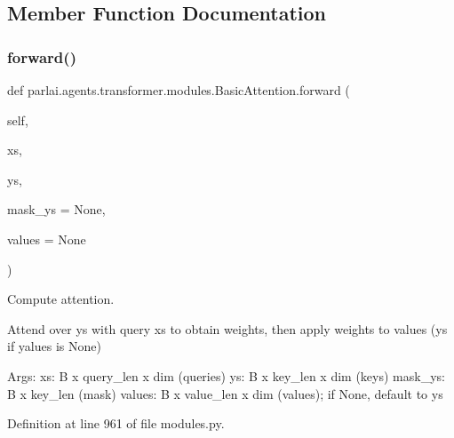 \subsection{Member Function Documentation}
\mbox{\label{classparlai_1_1agents_1_1transformer_1_1modules_1_1BasicAttention_adb18b6c2564672c1820b3c72583dc0c0}} 
\subsubsection{\texorpdfstring{forward()}{forward()}}
{\footnotesize\ttfamily def parlai.\+agents.\+transformer.\+modules.\+Basic\+Attention.\+forward (\begin{DoxyParamCaption}\item[{}]{self,  }\item[{}]{xs,  }\item[{}]{ys,  }\item[{}]{mask\+\_\+ys = {\ttfamily None},  }\item[{}]{values = {\ttfamily None} }\end{DoxyParamCaption})}

\begin{DoxyVerb}Compute attention.

Attend over ys with query xs to obtain weights, then apply weights to
values (ys if yalues is None)

Args:
    xs: B x query_len x dim (queries)
    ys: B x key_len x dim (keys)
    mask_ys: B x key_len (mask)
    values: B x value_len x dim (values); if None, default to ys
\end{DoxyVerb}
 

Definition at line 961 of file modules.\+py.


